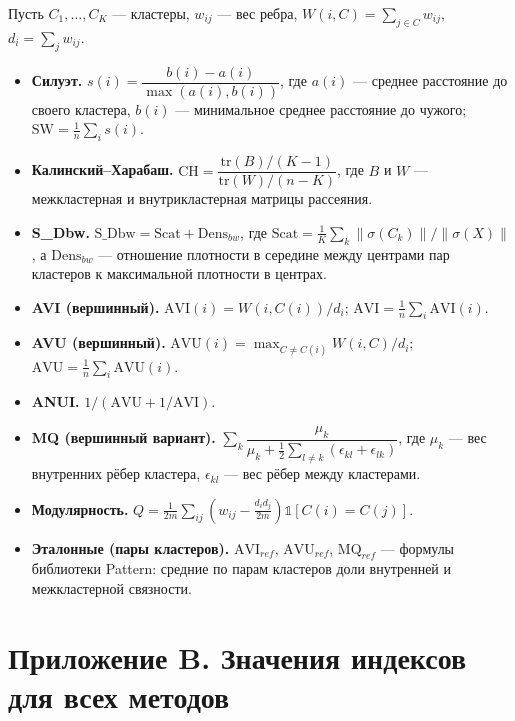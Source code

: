 \documentclass[11pt,a4paper]{article}
\providecommand{\tightlist}{\setlength{\itemsep}{1pt}\setlength{\parskip}{0pt}}
\begin{document}
Пусть \(C_1,\dots,C_K\) --- кластеры, \(w_{ij}\) --- вес ребра, \(W(i,C) = \sum_{j \in C} w_{ij}\), \(d_i = \sum_j w_{ij}\).

\begin{itemize}
\tightlist
\item
  \textbf{Силуэт.} \(s(i) = \dfrac{b(i)-a(i)}{\max(a(i),b(i))}\), где \(a(i)\) --- среднее расстояние до своего кластера, \(b(i)\) --- минимальное среднее расстояние до чужого; \(\mathrm{SW} = \frac1n \sum_i s(i)\).
\item
  \textbf{Калинский--Харабаш.} \(\mathrm{CH} = \dfrac{\mathrm{tr}(B)/(K-1)}{\mathrm{tr}(W)/(n-K)}\), где \(B\) и \(W\) --- межкластерная и внутрикластерная матрицы рассеяния.
\item
  \textbf{S\_Dbw.} \(\mathrm{S\_Dbw} = \mathrm{Scat} + \mathrm{Dens}_{bw}\), где \(\mathrm{Scat} = \frac1K\sum_k \lVert\sigma(C_k)\rVert / \lVert\sigma(X)\rVert\), а \(\mathrm{Dens}_{bw}\) --- отношение плотности в середине между центрами пар кластеров к максимальной плотности в центрах.
\item
  \textbf{AVI (вершинный).} \(\mathrm{AVI}(i) = W(i, C(i))/d_i\); \(\mathrm{AVI} = \frac1n \sum_i \mathrm{AVI}(i)\).
\item
  \textbf{AVU (вершинный).} \(\mathrm{AVU}(i) = \max_{C \ne C(i)} W(i,C)/d_i\); \(\mathrm{AVU} = \frac1n \sum_i \mathrm{AVU}(i)\).
\item
  \textbf{ANUI.} \(1/(\mathrm{AVU} + 1/\mathrm{AVI})\).
\item
  \textbf{MQ (вершинный вариант).} \(\sum_k \dfrac{\mu_k}{\mu_k + \tfrac12\sum_{l\ne k}(\epsilon_{kl}+\epsilon_{lk})}\), где \(\mu_k\) --- вес внутренних рёбер кластера, \(\epsilon_{kl}\) --- вес рёбер между кластерами.
\item
  \textbf{Модулярность.} \(Q = \frac{1}{2m}\sum_{ij}\left(w_{ij} - \frac{d_i d_j}{2m}\right)\mathbb 1[C(i)=C(j)]\).
\item
  \textbf{Эталонные (пары кластеров).} \(\mathrm{AVI}_{ref}\), \(\mathrm{AVU}_{ref}\), \(\mathrm{MQ}_{ref}\) --- формулы библиотеки Pattern: средние по парам кластеров доли внутренней и межкластерной связности.
\end{itemize}

\section*{Приложение B. Значения индексов для всех методов}\label{ux43fux440ux438ux43bux43eux436ux435ux43dux438ux435-b.-ux437ux43dux430ux447ux435ux43dux438ux44f-ux438ux43dux434ux435ux43aux441ux43eux432-ux434ux43bux44f-ux432ux441ux435ux445-ux43cux435ux442ux43eux434ux43eux432}
\end{document}
